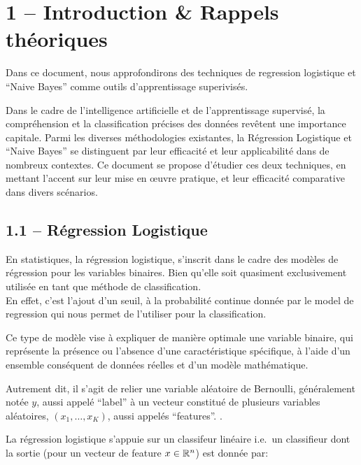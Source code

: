 \documentclass[
]{article}
\author{}
\date{}
\begin{document}
\intro{}

\hypertarget{introduction-rappels-thuxe9oriques}{%
\section{1 -- Introduction \& Rappels
théoriques}\label{introduction-rappels-thuxe9oriques}}

Dans ce document, nous approfondirons des techniques de regression
logistique et ``Naive Bayes'' comme outils d'apprentissage superivisés.

Dans le cadre de l'intelligence artificielle et de l'apprentissage
supervisé, la compréhension et la classification précises des données
revêtent une importance capitale. Parmi les diverses méthodologies
existantes, la Régression Logistique et ``Naive Bayes'' se distinguent
par leur efficacité et leur applicabilité dans de nombreux contextes. Ce
document se propose d'étudier ces deux techniques, en mettant l'accent
sur leur mise en œuvre pratique, et leur efficacité comparative dans
divers scénarios.

\hypertarget{ruxe9gression-logistique}{%
\subsection{1.1 -- Régression
Logistique}\label{ruxe9gression-logistique}}

En statistiques, la régression logistique, s'inscrit dans le cadre des
modèles de régression pour les variables binaires. Bien qu'elle soit
quasiment exclusivement utilisée en tant que méthode de
classification.\\
En effet, c'est l'ajout d'un seuil, à la probabilité continue donnée par
le model de regression qui nous permet de l'utiliser pour la
classification.

Ce type de modèle vise à expliquer de manière optimale une variable
binaire, qui représente la présence ou l'absence d'une caractéristique
spécifique, à l'aide d'un ensemble conséquent de données réelles et d'un
modèle mathématique.

Autrement dit, il s'agit de relier une variable aléatoire de Bernoulli,
généralement notée \(y\), aussi appelé ``label'' à un vecteur constitué
de plusieurs variables aléatoires, \((x_1, \ldots, x_K)\), aussi appelés
``features''. \cite{RegressionLogistique2023}.

La régression logistique s'appuie sur un classifeur linéaire
\cite{ClassifieurLineaire2022} i.e.~un classifieur dont la sortie (pour
un vecteur de feature \(x \in \mathbb{R}^n\)) est donnée par:
\end{document}
